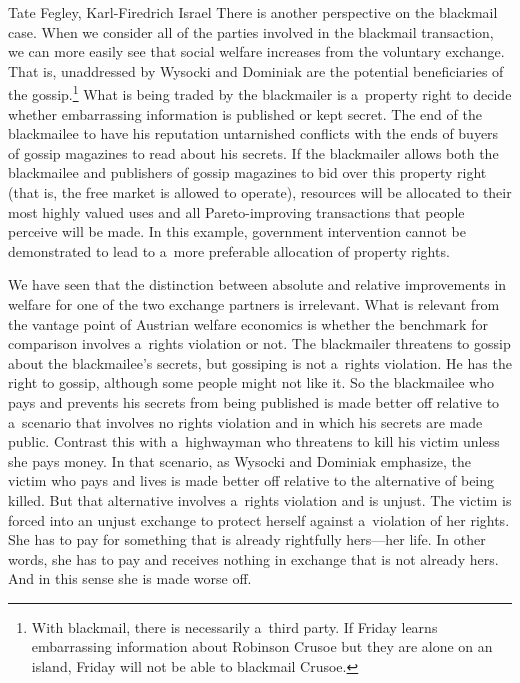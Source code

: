 \begin{artengenv2auth}{Tate Fegley, Karl-Firedrich Israel}
There is another perspective on the blackmail case. When we consider all of the parties involved in the blackmail transaction, we can more easily see that social welfare increases from the voluntary exchange. That is, unaddressed by Wysocki and Dominiak are the potential beneficiaries of the gossip.\footnote{With blackmail, there is necessarily a~third party. If Friday learns embarrassing information about Robinson Crusoe but they are alone on an island, Friday will not be able to blackmail Crusoe.} What is being traded by the blackmailer is a~property right to decide whether embarrassing information is published or kept secret. The end of the blackmailee to have his reputation untarnished conflicts with the ends of buyers of gossip magazines to read about his secrets. If the blackmailer allows both the blackmailee and publishers of gossip magazines to bid over this property right (that is, the free market is allowed to operate), resources will be allocated to their most highly valued uses and all Pareto-improving transactions that people perceive will be made. In this example, government intervention cannot be demonstrated to lead to a~more preferable allocation of property rights.



We have seen that the distinction between absolute and relative improvements in welfare for one of the two exchange partners is irrelevant. What is relevant from the vantage point of Austrian welfare economics is whether the benchmark for comparison involves a~rights violation or not. The blackmailer threatens to gossip about the blackmailee's secrets, but gossiping is not a~rights violation. He has the right to gossip, although some people might not like it. So the blackmailee who pays and prevents his secrets from being published is made better off relative to a~scenario that involves no rights violation and in which his secrets are made public. Contrast this with a~highwayman who threatens to kill his victim unless she pays money. In that scenario, as Wysocki and Dominiak 
\parencite*[][pp.54–55]{wysocki_how_2023} %
 emphasize, the victim who pays and lives is made better off relative to the alternative of being killed. But that alternative involves a~rights violation and is unjust. The victim is forced into an unjust exchange to protect herself against a~violation of her rights. She has to pay for something that is already rightfully hers---her life. In other words, she has to pay and receives nothing in exchange that is not already hers. And in this sense she is made worse off.




\end{artengenv2auth}
